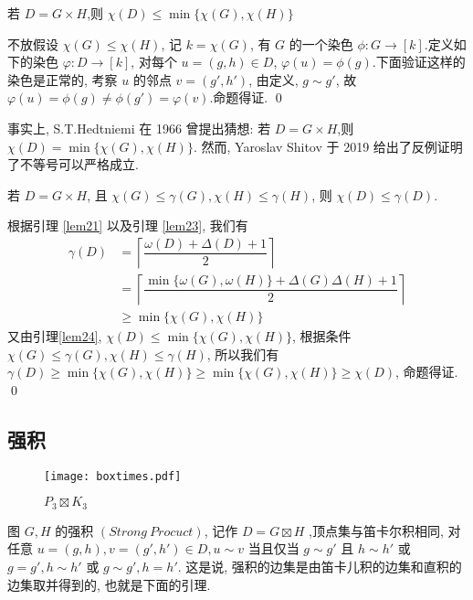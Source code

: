 \documentclass[12pt,a4paper]{article}%
\begin{document}
\begin{lemma}\label{lem24}
    若 $D = G \times H$,则 $\chi(D) \leq \min \{\chi(G), \chi(H)\} $
\end{lemma}
\begin{pf}
    不放假设 $\chi(G) \leq \chi(H)$, 记 $k = \chi(G)$, 有 $G$ 的一个染色 $\phi:G \rightarrow [k]$.定义如下的染色 $\varphi:D \rightarrow [k]$, 对每个 $u = (g,h)\in D$, $\varphi(u) = \phi(g)$.下面验证这样的染色是正常的, 考察 $u$ 的邻点 $v=(g',h')$, 由定义, $g \sim g'$, 故 $\varphi(u) = \phi(g) \neq \phi(g') = \varphi(v)$.命题得证. \qed
\end{pf}

事实上, S.T.Hedtniemi\cite{Hedetniemi1967} 在 1966 曾提出猜想: 若 $D = G \times H$,则 $\chi(D) = \min \{\chi(G), \chi(H)\} $. 然而, Yaroslav Shitov\cite{shitov2019} 于 2019 给出了反例证明了不等号可以严格成立. 

\begin{thm}
    若 $D = G \times H$, 且 $\chi (G) \le \gamma (G), \chi (H) \le \gamma (H) $, 则 $\chi (D) \le \gamma (D)$.
\end{thm}
\begin{pf}
    根据引理 \ref{lem21} 以及引理 \ref{lem23}, 我们有 
    \begin{align*}
        \gamma(D) &= \left\lceil \dfrac{\omega (D) + \Delta (D) + 1}{2}  \right\rceil  \\
                &= \left\lceil \dfrac{\min \{\omega(G), \omega(H)\} + \Delta(G) \Delta(H) + 1}{2}  \right\rceil\\
                &\geq \min \{\chi(G), \chi(H)\}
    \end{align*}
    又由引理\ref{lem24}, $\chi(D) \leq \min \{\chi(G), \chi(H)\} $, 根据条件 $\chi (G) \le \gamma (G), \chi (H) \le \gamma (H) $, 所以我们有 $\gamma(D) \geq \min \{\chi(G), \chi(H)\} \geq \min \{\chi(G), \chi(H)\} \geq \chi(D)$, 命题得证. \qed
\end{pf}

\subsection{强积}

\begin{figure}[b]
\begin{center}
\texttt{[image: boxtimes.pdf]}
\caption{$P_3\boxtimes K_3$}
\label{boxtimes_pic}
\end{center}
\end{figure}

图 $G,H$ 的强积 $(Strong \ Procuct)$, 记作 $D = G \boxtimes H$ ,顶点集与笛卡尔积相同, 对任意 $u=(g,h), v=(g',h') \in D, u \sim v$ 当且仅当 $g \sim g'$ 且 $ h \sim h'$ 或 $g = g',  h \sim h'$ 或 $g \sim g', h = h'$. 这是说, 强积的边集是由笛卡儿积的边集和直积的边集取并得到的, 也就是下面的引理.
\end{document}

